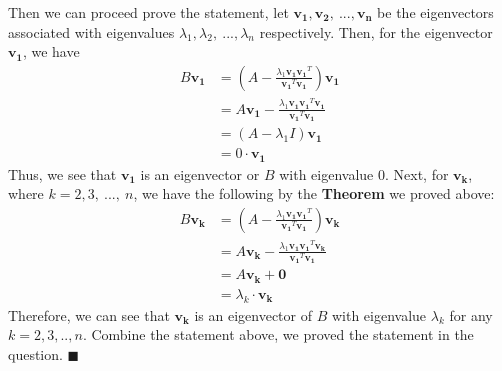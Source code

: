 \documentclass[11pt]{article}
\begin{document}
Then we can proceed prove the statement, let $\mathbf{v_1},\mathbf{v_2},\ ..., \mathbf{v_n}$ be the eigenvectors associated with eigenvalues $\lambda_1, \lambda_2,\ ..., \lambda_n$ respectively.
Then, for the eigenvector $\mathbf{v_1}$, we have
\begin{align*}
B\mathbf{v_1} &= \left(A- \frac{\lambda_1\mathbf{v_1}\mathbf{v_1}^T}{\mathbf{v_1}^T\mathbf{v_1}}\right)\mathbf{v_1}\\
& = A\mathbf{v_1} - \frac{\lambda_1\mathbf{v_1}\mathbf{v_1}^T\mathbf{v_1}}{\mathbf{v_1}^T\mathbf{v_1}}\\
& = (A-\lambda_1 I)\mathbf{v_1}\\
& = 0\cdot \mathbf{v_1}
\end{align*}
Thus, we see that $\mathbf{v_1}$ is an eigenvector or $B$ with eigenvalue $0$.
Next, for $\mathbf{v_k}$, where $k = 2,3,\ ...,\ n $, we have the following by the \textbf{Theorem} we proved above:
\begin{align*}
	B\mathbf{v_k} &= \left(A- \frac{\lambda_1\mathbf{v_1}\mathbf{v_1}^T}{\mathbf{v_1}^T\mathbf{v_1}}\right)\mathbf{v_k}\\
	& = A\mathbf{v_k} - \frac{\lambda_1\mathbf{v_1}\mathbf{v_1}^T\mathbf{v_k}}{\mathbf{v_1}^T\mathbf{v_1}}\\
	& = A\mathbf{v_k} + \mathbf{0}\\
	& = \lambda_k \cdot \mathbf{v_k}
\end{align*}
Therefore, we can see that $\mathbf{v_k}$ is an eigenvector of $B$ with eigenvalue $\lambda_k$ for any $k = 2,3,..,n$. Combine the statement above, we proved the statement in the question. \hfill $\blacksquare$
\end{document}
